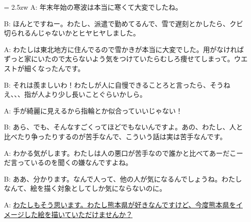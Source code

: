 \documentclass[11pt]{amsart}
\title{}
\author{}
\newenvironment{hangall}[1]{\hangindent = 2.5zw\everypar{\hangindent = 2.5zw}}{}
\begin{document}
\maketitle
\begin{hangall}{}%
A: 年末年始の寒波は本当に寒くて大変でしたね。

B: ほんとですねー。わたし、派遣で勤めてるんで、雪で遅刻とかしたら、クビ切られるんじゃないかとヒヤヒヤしました。

A: わたしは東北地方に住んでるので雪かきが本当に大変でした。用がなければずっと家にいたので太らないよう気をつけていたらむしろ痩せてしまって。ウエストが細くなったんです。

B: それは羨ましいわ！わたしが人に自慢できることろと言ったら、そうねえ、、、指が人より少し長いことぐらいかしら。

A: 手が綺麗に見えるから指輪とか似合っていいじゃない！

B: あら、でも、そんなすごくってほどでもないんですよ。あの、わたし、人と比べたり争ったりするのが苦手なんで、こういう話は実は苦手なんです。

A: わかる気がします。わたしは人の悪口が苦手なので誰かと比べてあーだこーだ言っているのを聞くの嫌なんですよね。

B: ああ、分かります。なんで人って、他の人が気になるんでしょうね。わたしなんて、絵を描く対象としてしか気にならないのに。

A: \ul{わたしもそう思います。わたし熊本県が好きなんですけど、今度熊本県をイメージした絵を描いていただけませんか？}\end{hangall}
\end{document}
